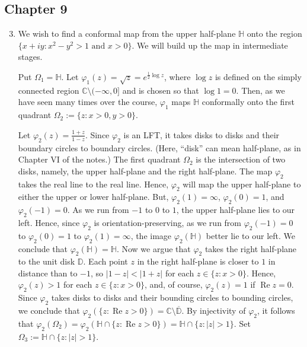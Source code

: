 \documentclass[11pt]{book}
\theoremstyle{definition}
\renewcommand{\Re}{\operatorname{Re}}
\begin{document}
\subsection{Chapter 9}
\begin{enumerate}
    \setcounter{enumi}{2}
  \item We wish to find a conformal map from the upper half-plane $\mathbb H$ onto the region $\{ x  + iy : x^2 - y^2 > 1 \text{ and } x > 0 \}$.  We will build up the map in intermediate stages. 


    Put $\Omega_1 = \mathbb H$.  Let $\varphi_1 (z) = \sqrt{z} = e^{\tfrac 1 2 \log z}$, where $\log z$ is defined on the simply connected region $\mathbb C \setminus (-\infty, 0]$ and is chosen so that $\log 1 = 0$.  Then, as we have seen many times over the course, $\varphi_1$ maps $\mathbb H$ conformally onto the first quadrant $\Omega_2 := \{ z : x > 0, y > 0 \}$.   

    Let $\varphi_2(z) = \tfrac{1+z}{1-z}$.  Since $\varphi_2$ is an LFT, it takes  disks to disks and their boundary circles to boundary circles.  (Here, ``disk'' can mean half-plane, as in Chapter VI of the notes.)  The first quadrant $\Omega_2$ is the intersection of two disks, namely, the upper half-plane and the right half-plane.  The map $\varphi_2$ takes the real line to the real line. Hence, $\varphi_2$ will map the upper half-plane to either the upper or lower half-plane.   But, $\varphi_2(1) = \infty$, $\varphi_2(0) = 1$, and $\varphi_2(-1) = 0$.  As we run from $-1$ to $0$ to $1$, the upper half-plane lies to our left.  Hence, since $\varphi_2$ is orientation-preserving, as we run from $\varphi_2(-1) = 0$ to $\varphi_2(0) = 1$ to $\varphi_2(1) = \infty$, the image $\varphi_2(\mathbb H)$ better lie to our left.  We conclude that $\varphi_2(\mathbb H)  = \mathbb H$.   Now we argue that $\varphi_2$ takes the right half-plane to the unit disk $\mathbb D$.  Each point $z$ in the right half-plane is closer to $1$ in distance than to $-1$, so $|1-z| < |1+z|$ for each $z \in \{ z : x > 0 \}$.  Hence, $\varphi_2(z) > 1$ for each $z\in \{ z : x > 0\}$, and, of course, $\varphi_2(z) = 1$ if $\Re z = 0$. Since $\varphi_2$ takes disks to disks and their bounding circles to bounding circles, we conclude that $\varphi_2 ( \{ z : \Re z >0 \} ) = \mathbb C \setminus \overline{\mathbb D}$.  By injectivity of $\varphi_2$, it follows that $\varphi_2(\Omega_2) = \varphi_2(\mathbb H \cap \{ z : \Re z > 0 \} ) = \mathbb H \cap \{ z : |z| > 1 \}$.  Set $\Omega_3 := \mathbb H \cap \{ z : |z| > 1 \}$. 



\end{enumerate}
\end{document}
